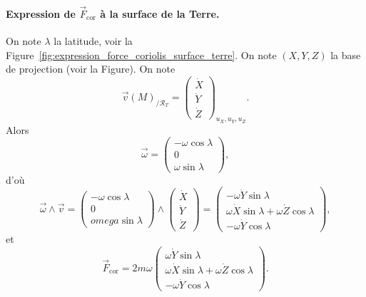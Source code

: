            \paragraph{Expression de $\vec{F}_{\text{cor}}$ à la surface de la Terre.}

                On note $\lambda$ la latitude, voir la Figure~\ref{fig:expression_force_coriolis_surface_terre}. On note $(X,Y,Z)$ la base de projection (voir la Figure). On note 
                \begin{equation*}
                    \vec{v}(M)_{/\mathcal{R}_T}=\begin{pmatrix}
                        \dot{X}\\\dot{Y}\\\dot{Z}
                    \end{pmatrix}_{u_X,u_Y,u_Z}.
                \end{equation*}
                Alors
                \begin{equation*}
                    \vec{\omega}=\begin{pmatrix}
                        -\omega\cos\lambda\\0\\\omega\sin\lambda
                    \end{pmatrix},
                \end{equation*}
                d'où
                \begin{equation*}
                    \vec{\omega}\wedge\vec{v}=\begin{pmatrix}
                        -\omega\cos\lambda\\0\\omega\sin\lambda
                    \end{pmatrix}\wedge\begin{pmatrix}
                        \dot{X}\\\dot{Y}\\\dot{Z}
                    \end{pmatrix}=\begin{pmatrix}
                        -\omega\dot{Y}\sin\lambda\\
                        \omega\dot{X}\sin\lambda+\omega\dot{Z}\cos\lambda\\
                        -\omega\dot{Y}\cos\lambda
                    \end{pmatrix},
                \end{equation*}
                et
                \begin{equation*}
                    \vec{F}_{\text{cor}}=2m\omega\begin{pmatrix}
                        \omega\dot{Y}\sin\lambda\\
                        \omega\dot{X}\sin\lambda+\omega\dot{Z}\cos\lambda\\
                        -\omega\dot{Y}\cos\lambda
                    \end{pmatrix}.
                \end{equation*}

